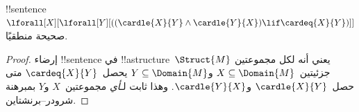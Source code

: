 \documentclass[../../../include/open-logic-section]{subfiles}
\begin{document}
\begin{prop}
!!{sentence}~$\lforall[X][\lforall[Y][((\cardle{X}{Y} \land
    \cardle{Y}{X}) \lif \cardeq{X}{Y})]]$ صحيحة منطقيًا.
\end{prop}

\begin{proof}
إرضاء !!{sentence} في !!a{structure}~$\Struct{M}$
يعني أنه لكل مجموعتين جزئيتين~$X \subseteq \Domain{M}$
و$Y \subseteq \Domain{M}$ يحصل~$\cardeq{X}{Y}$ متى
حصل~$\cardle{X}{Y}$ و$\cardle{Y}{X}$.
وهذا ثابت لـ\emph{أي} مجموعتين~$X$ و$Y$ بمبرهنة شرودر--برنشتاين.
\end{proof}
\end{document}
